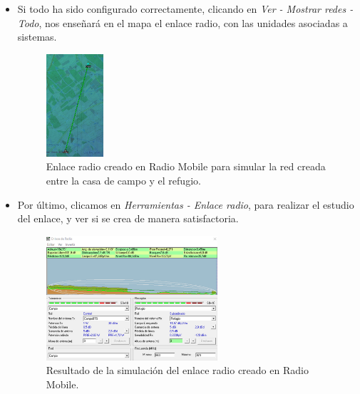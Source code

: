 \documentclass[12pt]{article}
\begin{document}
\begin{itemize}
		\item Si todo ha sido configurado correctamente, clicando en \textit{Ver - Mostrar redes - Todo}, nos enseñará en el mapa el enlace radio, con las unidades asociadas a sistemas.
		
		\begin{figure}[h!]
			\begin{center}
				\includegraphics[width=0.2\textwidth]{img/mostrarRed_radioMobile.png}
				\caption{Enlace radio creado en Radio Mobile para simular la red creada entre la casa de campo y el refugio.}
				\label{fig: mostrar red radio mobile}
			\end{center}
		\end{figure}
		
		\pagebreak
		
		\item Por último, clicamos en \textit{Herramientas - Enlace radio}, para realizar el estudio del enlace, y ver si se crea de manera satisfactoria. 
		
		
		\begin{figure}[h!]
			\begin{center}
				\includegraphics[width=0.6\textwidth]{img/ejemplo_resultadoEnlace_radioMobile.png}
				\caption{Resultado de la simulación del enlace radio creado en Radio Mobile.}
				\label{fig: resultado enlace radio mobile}
			\end{center}
		\end{figure}
	\end{itemize}
\end{document}
